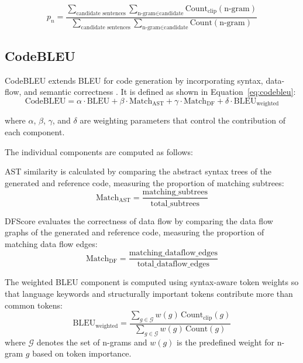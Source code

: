 \begin{equation}\label{eq:pn}
p_{n}=
\frac{
\sum_{\text{candidate sentences}}
\sum_{\text{n-gram} \in \text{candidate}}
\text{Count}_{\text{clip}}(\text{n-gram})
}{
\sum_{\text{candidate sentences}}
\sum_{\text{n-gram} \in \text{candidate}}
\text{Count}(\text{n-gram})
}
\end{equation}


\subsection{CodeBLEU}
CodeBLEU extends BLEU for code generation by incorporating syntax, data-flow, and semantic correctness \cite{Ren2020CodeBLEU}. 
It is defined as shown in Equation~\eqref{eq:codebleu}:
\begin{equation}\label{eq:codebleu}
\text{CodeBLEU} =
\alpha \cdot \text{BLEU}
+ \beta \cdot \text{Match}_{\text{AST}}
+ \gamma \cdot \text{Match}_{\text{DF}}
+ \delta \cdot \text{BLEU}_{\text{weighted}}
\end{equation}

where $\alpha$, $\beta$, $\gamma$, and $\delta$ are weighting parameters that control the contribution of each component.

The individual components are computed as follows:

AST similarity is calculated by comparing the abstract syntax trees of the generated and reference code, measuring the proportion of matching subtrees:
\begin{equation}\label{eq:ast}
\text{Match}_{\text{AST}} =
\frac{\text{matching\_subtrees}}{\text{total\_subtrees}}
\end{equation}

DFScore evaluates the correctness of data flow by comparing the data flow graphs of the generated and reference code, measuring the proportion of matching data flow edges:
\begin{equation}\label{eq:dfscore}
\text{Match}_{\text{DF}} =
\frac{\text{matching\_dataflow\_edges}}{\text{total\_dataflow\_edges}}
\end{equation}

The weighted BLEU component is computed using syntax-aware token weights so that language keywords and structurally important tokens contribute more than common tokens:
\begin{equation}\label{eq:weighted_bleu}
\text{BLEU}_{\text{weighted}} =
\frac{\sum_{g \in \mathcal{G}} w(g)\,\text{Count}_{\text{clip}}(g)}{\sum_{g \in \mathcal{G}} w(g)\,\text{Count}(g)}
\end{equation}
where $\mathcal{G}$ denotes the set of n-grams and $w(g)$ is the predefined weight for n-gram $g$ based on token importance.


